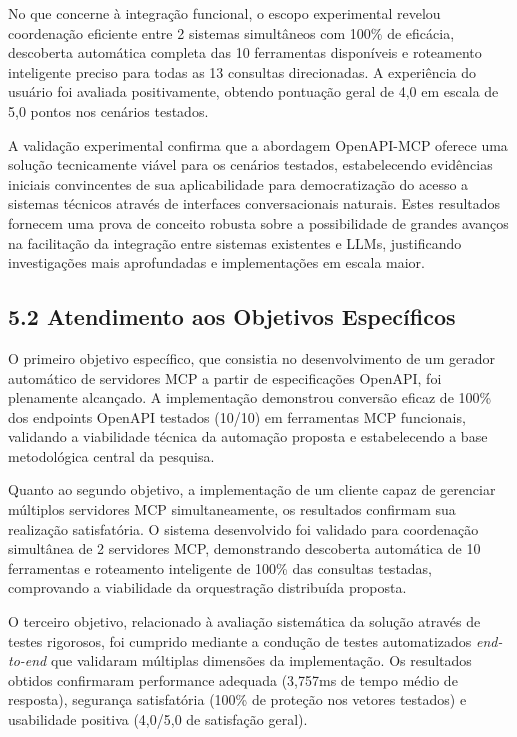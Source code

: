\documentclass[
]{article}
\begin{document}
No que concerne à integração funcional, o escopo experimental revelou
coordenação eficiente entre 2 sistemas simultâneos com 100\% de
eficácia, descoberta automática completa das 10 ferramentas disponíveis
e roteamento inteligente preciso para todas as 13 consultas
direcionadas. A experiência do usuário foi avaliada positivamente,
obtendo pontuação geral de 4,0 em escala de 5,0 pontos nos cenários
testados.

A validação experimental confirma que a abordagem OpenAPI-MCP oferece
uma solução tecnicamente viável para os cenários testados, estabelecendo
evidências iniciais convincentes de sua aplicabilidade para
democratização do acesso a sistemas técnicos através de interfaces
conversacionais naturais. Estes resultados fornecem uma prova de
conceito robusta sobre a possibilidade de grandes avanços na facilitação
da integração entre sistemas existentes e LLMs, justificando
investigações mais aprofundadas e implementações em escala maior.

\subsection{5.2 Atendimento aos Objetivos
Específicos}\label{atendimento-aos-objetivos-especuxedficos}

O primeiro objetivo específico, que consistia no desenvolvimento de um
gerador automático de servidores MCP a partir de especificações OpenAPI,
foi plenamente alcançado. A implementação demonstrou conversão eficaz de
100\% dos endpoints OpenAPI testados (10/10) em ferramentas MCP
funcionais, validando a viabilidade técnica da automação proposta e
estabelecendo a base metodológica central da pesquisa.

Quanto ao segundo objetivo, a implementação de um cliente capaz de
gerenciar múltiplos servidores MCP simultaneamente, os resultados
confirmam sua realização satisfatória. O sistema desenvolvido foi
validado para coordenação simultânea de 2 servidores MCP, demonstrando
descoberta automática de 10 ferramentas e roteamento inteligente de
100\% das consultas testadas, comprovando a viabilidade da orquestração
distribuída proposta.

O terceiro objetivo, relacionado à avaliação sistemática da solução
através de testes rigorosos, foi cumprido mediante a condução de testes
automatizados \emph{end-to-end} que validaram múltiplas dimensões da
implementação. Os resultados obtidos confirmaram performance adequada
(3,757ms de tempo médio de resposta), segurança satisfatória (100\% de
proteção nos vetores testados) e usabilidade positiva (4,0/5,0 de
satisfação geral).
\end{document}
